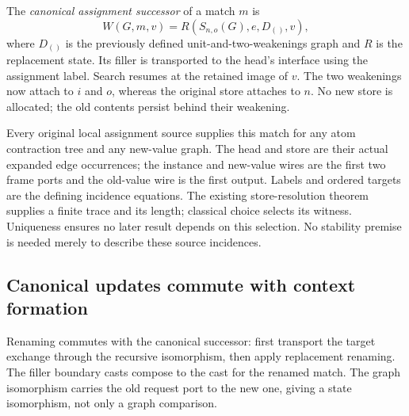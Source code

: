 




The \emph{canonical assignment successor} of a match $m$ is
\[
 W(G,m,v)=R(S_{n,o}(G),e,D_{()},v),
\]
where $D_{()}$ is the previously defined unit-and-two-weakenings graph and
$R$ is the replacement state. Its filler is transported to the head's
interface using the assignment label. Search resumes at the retained image
of $v$. The two weakenings now attach to $i$ and $o$, whereas the original
store attaches to $n$. No new store is allocated; the old contents persist
behind their weakening.



Every original local assignment source supplies this match for any atom
contraction tree and any new-value graph. The head and store are their actual
expanded edge occurrences; the instance and new-value wires are the first
two frame ports and the old-value wire is the first output. Labels and
ordered targets are the defining incidence equations. The existing
store-resolution theorem supplies a finite trace and its length; classical
choice selects its witness. Uniqueness ensures no later result depends on
this selection. No stability premise is needed merely to describe these
source incidences.


\subsection{Canonical updates commute with context formation}

Renaming commutes with the canonical successor: first transport the target
exchange through the recursive isomorphism, then apply replacement renaming.
The filler boundary casts compose to the cast for the renamed match.
The graph isomorphism carries the old request port to the new one, giving a
state isomorphism, not only a graph comparison.

